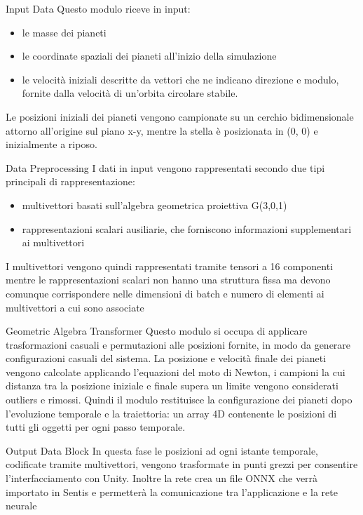 \begin{frame}{Input Data}
    Questo modulo riceve in input:
    \begin{itemize}
        \item le masse dei pianeti
        \item le coordinate spaziali dei pianeti all'inizio della simulazione
        \item le velocità iniziali descritte da vettori che ne indicano direzione e modulo, fornite dalla velocità di un'orbita circolare stabile.
    \end{itemize}
    Le posizioni iniziali dei pianeti vengono campionate su un cerchio bidimensionale attorno all'origine sul piano x-y, mentre la stella è posizionata in (0, 0) e inizialmente a riposo.
    
\end{frame}

\begin{frame}{Data Preprocessing}
    I dati in input vengono rappresentati secondo due tipi principali di rappresentazione:
    \begin{itemize}
        \item multivettori basati sull'algebra geometrica proiettiva G(3,0,1)
        \item rappresentazioni scalari ausiliarie, che forniscono informazioni supplementari ai multivettori
    \end{itemize}
    I multivettori vengono quindi rappresentati tramite tensori a 16 componenti mentre  le rappresentazioni scalari non hanno una struttura fissa
     ma devono comunque corrispondere nelle dimensioni di batch e numero di elementi ai multivettori a cui sono associate
\end{frame}

\begin{frame}{Geometric Algebra Transformer}
    Questo modulo si occupa di applicare trasformazioni casuali e permutazioni alle posizioni fornite, in modo da generare configurazioni casuali del sistema.
    La posizione e velocità finale dei pianeti vengono calcolate applicando l'equazioni del moto di Newton, i campioni la cui distanza tra la posizione iniziale e finale supera un limite vengono considerati outliers e rimossi.
    Quindi il modulo restituisce la configurazione dei pianeti dopo l'evoluzione temporale e la traiettoria: un array 4D contenente le posizioni di tutti gli oggetti per ogni passo temporale.
\end{frame}{}

\begin{frame}{Output Data Block}
    In questa fase le posizioni ad ogni istante temporale, codificate tramite multivettori, vengono trasformate in punti grezzi per consentire l'interfacciamento con Unity. Inoltre la rete crea un file ONNX che verrà importato in Sentis e permetterà la comunicazione tra l'applicazione e la rete neurale
\end{frame}

